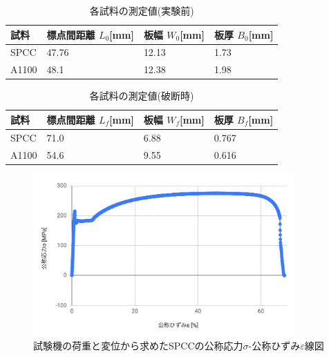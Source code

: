 \documentclass[a4paper,11pt,uplatex]{jsarticle}
\begin{document}
\begin{table}[H]
\begin{center}
\caption{各試料の測定値(実験前)}
\label{試料1}
\begin{tabular}{|l|l|l|l|} \hline
試料    & 標点間距離 $L_0$[mm] & 板幅 $W_0$[mm] & 板厚 $B_0$[mm]\\ \hline
SPCC  & 47.76        & 12.13 & 1.73 \\
A1100 & 48.1         & 12.38 & 1.98 \\ \hline
\end{tabular}
\end{center}
\end{table}

\begin{table}[H]
\begin{center}
\caption{各試料の測定値(破断時)}
\label{試料2}
\begin{tabular}{|l|l|l|l|} \hline
  試料    & 標点間距離 $L_f$[mm] & 板幅 $W_f$[mm] & 板厚 $B_f$[mm] \\ \hline
  SPCC  & 71.0         & 6.88      & 0.767    \\
  A1100 & 54.6         & 9.55      & 0.616  \\ \hline
\end{tabular}
\end{center}
\end{table}

\begin{figure}[H]
      \begin{center}
        \includegraphics[width = 10cm]{画像/公称線図.png}
        \caption{試験機の荷重と変位から求めたSPCCの公称応力$\sigma$-公称ひずみ$\varepsilon$線図}
        \label{SPCC公称線図}
      \end{center}
\end{figure}
\end{document}
